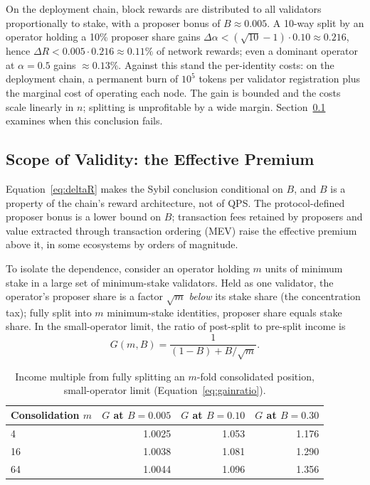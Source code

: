 \documentclass[11pt,a4paper]{article}
\begin{document}
On the deployment chain, block rewards are distributed to all validators proportionally to stake, with a proposer bonus of $B \approx 0.005$. A 10-way split by an operator holding a 10\% proposer share gains $\Delta\alpha < (\sqrt{10}-1) \cdot 0.10 \approx 0.216$, hence $\Delta R < 0.005 \cdot 0.216 \approx 0.11\%$ of network rewards; even a dominant operator at $\alpha = 0.5$ gains $\approx 0.13\%$. Against this stand the per-identity costs: on the deployment chain, a permanent burn of $10^5$ tokens per validator registration plus the marginal cost of operating each node. The gain is bounded and the costs scale linearly in $n$; splitting is unprofitable by a wide margin. Section~\ref{sec:scope} examines when this conclusion fails.

\subsection{Scope of Validity: the Effective Premium}
\label{sec:scope}

Equation~\eqref{eq:deltaR} makes the Sybil conclusion conditional on $B$, and $B$ is a property of the chain's reward architecture, not of QPS. The protocol-defined proposer bonus is a lower bound on $B$; transaction fees retained by proposers and value extracted through transaction ordering (MEV) \cite{daian} raise the effective premium above it, in some ecosystems by orders of magnitude.

To isolate the dependence, consider an operator holding $m$ units of minimum stake in a large set of minimum-stake validators. Held as one validator, the operator's proposer share is a factor $\sqrt{m}$ \emph{below} its stake share (the concentration tax); fully split into $m$ minimum-stake identities, proposer share equals stake share. In the small-operator limit, the ratio of post-split to pre-split income is
\begin{equation}
\label{eq:gainratio}
G(m, B) = \frac{1}{(1-B) + B/\sqrt{m}} .
\end{equation}

\begin{table}[H]
\centering
\begin{tabular}{lrrr}
\toprule
Consolidation $m$ & $G$ at $B=0.005$ & $G$ at $B=0.10$ & $G$ at $B=0.30$ \\
\midrule
4   & 1.0025 & 1.053 & 1.176 \\
16  & 1.0038 & 1.081 & 1.290 \\
64  & 1.0044 & 1.096 & 1.356 \\
\bottomrule
\end{tabular}
\caption{Income multiple from fully splitting an $m$-fold consolidated position, small-operator limit (Equation~\ref{eq:gainratio}).}
\label{tab:premium}
\end{table}
\end{document}
